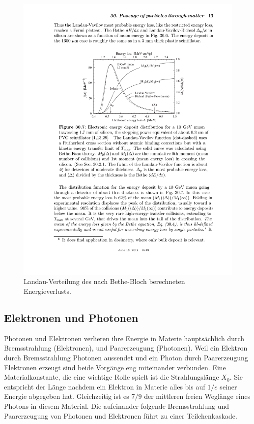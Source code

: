 \begin{figure}
\centering
\includegraphics[]{./input/landau.pdf}\caption{Landau-Verteilung des nach Bethe-Bloch berechneten Energieverlusts.\cite{Passage_through_matter}}\label{fig:landau}
\end{figure}
\subsection{Elektronen und Photonen}
Photonen und Elektronen verlieren ihre Energie in Materie hauptsächlich durch Bremsstrahlung (Elektronen), und Paarerzeugung (Photonen). Weil ein Elektron durch Bremsstrahlung Photonen aussendet und ein Photon durch Paarerzeugung Elektronen erzeugt sind beide Vorgänge eng miteinander verbunden. Eine Materialkonstante, die eine wichtige Rolle spielt ist die Strahlungslänge $X_0$. Sie entspricht der Länge nachdem ein Elektron in Materie alles bis auf $1/e$ seiner Energie abgegeben hat. Gleichzeitig ist es $7/9$ der mittleren freien Weglänge eines Photons in diesem Material. Die aufeinander folgende Bremsstrahlung und Paarerzeugung von Photonen und Elektronen führt zu einer Teilchenkaskade.

